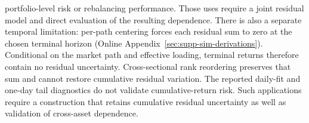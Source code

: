 portfolio-level risk or rebalancing performance. Those uses require a
joint residual model and direct evaluation of the resulting dependence.
There is also a separate temporal limitation: per-path centering
forces each residual sum to zero at the chosen terminal horizon
(Online Appendix~\ref{sec:supp-sim-derivations}). Conditional on the
market path and effective loading, terminal returns therefore contain
no residual uncertainty. Cross-sectional rank reordering preserves
that sum and cannot restore cumulative residual variation. The
reported daily-fit and one-day tail diagnostics do not validate
cumulative-return risk. Such applications require a construction that
retains cumulative residual uncertainty as well as validation of
cross-asset dependence.
